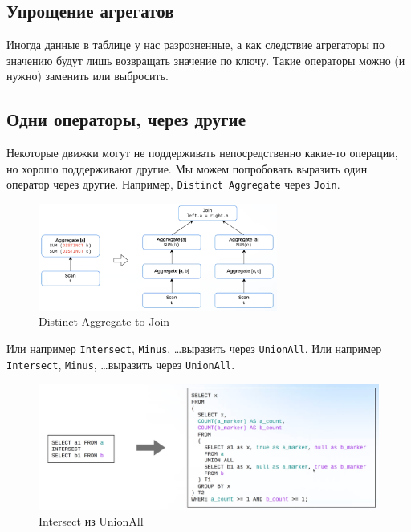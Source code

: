 \documentclass[11pt]{article}
\begin{document}
    \subsection*{Упрощение агрегатов}

    Иногда данные в таблице у нас разрозненные, а как следствие агрегаторы по значению будут лишь возвращать значение по ключу.
    Такие операторы можно (и нужно) заменить или выбросить.

    \newpage

    \subsection{Одни операторы, через другие}

    Некоторые движки могут не поддерживать непосредственно какие-то операции, но хорошо поддерживают другие.
    Мы можем попробовать выразить один оператор через другие.
    Например, \texttt{Distinct Aggregate} через \texttt{Join}.

    \begin{figure}[h!]
        \centering
        \includegraphics[width=0.7\textwidth]{Pictures/Ключевые оптимизации/Distinct Aggregate to Join}
        \caption{Distinct Aggregate to Join}
    \end{figure}

    Или например \texttt{Intersect}, \texttt{Minus}, \dots выразить через \texttt{UnionAll}.
    Или например \texttt{Intersect}, \texttt{Minus}, \dots выразить через \texttt{UnionAll}.

    \begin{figure}[h!]
        \centering
        \includegraphics[width=\textwidth]{Pictures/Ключевые оптимизации/Intersect из UnionAll}
        \caption{Intersect из UnionAll}
    \end{figure}
\end{document}

